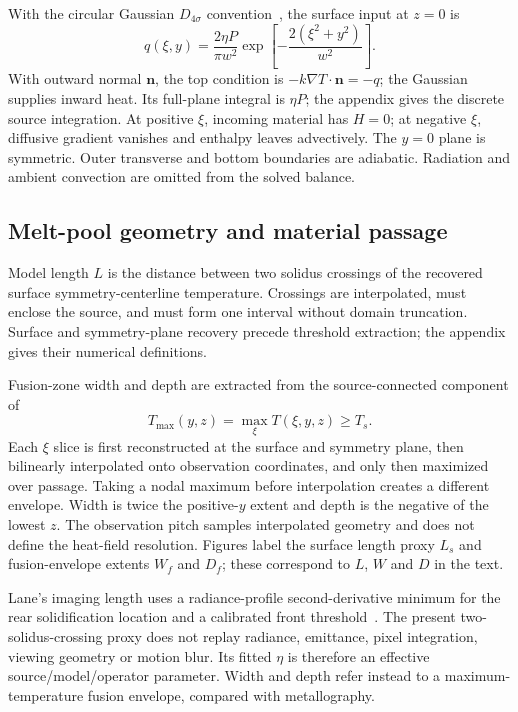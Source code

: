 With the circular Gaussian $D_{4\sigma}$ convention~\cite{dynamic2024}, the surface input at $z=0$ is
\begin{equation}
 q(\xi,y)=\frac{2\eta P}{\pi w^2}
 \exp\!\left[-\frac{2(\xi^2+y^2)}{w^2}\right].
 \label{eq:source}
\end{equation}
With outward normal $\bm n$, the top condition is $-k\nabla T\cdot\bm n=-q$; the Gaussian supplies inward heat. Its full-plane integral is $\eta P$; the appendix gives the discrete source integration. At positive $\xi$, incoming material has $H=0$; at negative $\xi$, diffusive gradient vanishes and enthalpy leaves advectively. The $y=0$ plane is symmetric. Outer transverse and bottom boundaries are adiabatic. Radiation and ambient convection are omitted from the solved balance.

\subsection{Melt-pool geometry and material passage}
Model length $L$ is the distance between two solidus crossings of the recovered surface symmetry-centerline temperature. Crossings are interpolated, must enclose the source, and must form one interval without domain truncation. Surface and symmetry-plane recovery precede threshold extraction; the appendix gives their numerical definitions.

Fusion-zone width and depth are extracted from the source-connected component of
\begin{equation}
 T_{\max}(y,z)=\max_\xi T(\xi,y,z)\geq T_s.
 \label{eq:fusion}
\end{equation}
Each $\xi$ slice is first reconstructed at the surface and symmetry plane, then bilinearly interpolated onto observation coordinates, and only then maximized over passage. Taking a nodal maximum before interpolation creates a different envelope. Width is twice the positive-$y$ extent and depth is the negative of the lowest $z$. The observation pitch samples interpolated geometry and does not define the heat-field resolution. Figures label the surface length proxy $L_s$ and fusion-envelope extents $W_f$ and $D_f$; these correspond to $L$, $W$ and $D$ in the text.

Lane's imaging length uses a radiance-profile second-derivative minimum for the rear solidification location and a calibrated front threshold~\cite{lane2020}. The present two-solidus-crossing proxy does not replay radiance, emittance, pixel integration, viewing geometry or motion blur. Its fitted $\eta$ is therefore an effective source/model/operator parameter. Width and depth refer instead to a maximum-temperature fusion envelope, compared with metallography.

